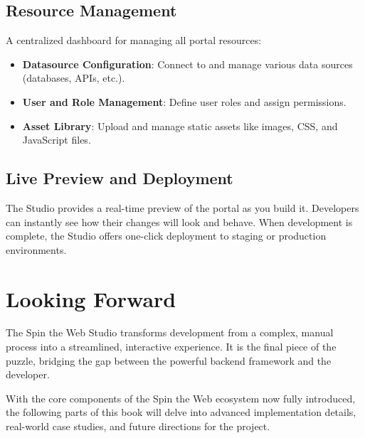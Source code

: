 \subsection{Resource Management}
A centralized dashboard for managing all portal resources:
\begin{itemize}
    \item \textbf{Datasource Configuration}: Connect to and manage various data sources (databases, APIs, etc.).
    \item \textbf{User and Role Management}: Define user roles and assign permissions.
    \item \textbf{Asset Library}: Upload and manage static assets like images, CSS, and JavaScript files.
\end{itemize}

\subsection{Live Preview and Deployment}
The Studio provides a real-time preview of the portal as you build it. Developers can instantly see how their changes will look and behave. When development is complete, the Studio offers one-click deployment to staging or production environments.

\section{Looking Forward}
\label{sec:studio-forward}

The Spin the Web Studio transforms \webbase{} development from a complex, manual process into a streamlined, interactive experience. It is the final piece of the puzzle, bridging the gap between the powerful backend framework and the developer.

With the core components of the Spin the Web ecosystem now fully introduced, the following parts of this book will delve into advanced implementation details, real-world case studies, and future directions for the project.
